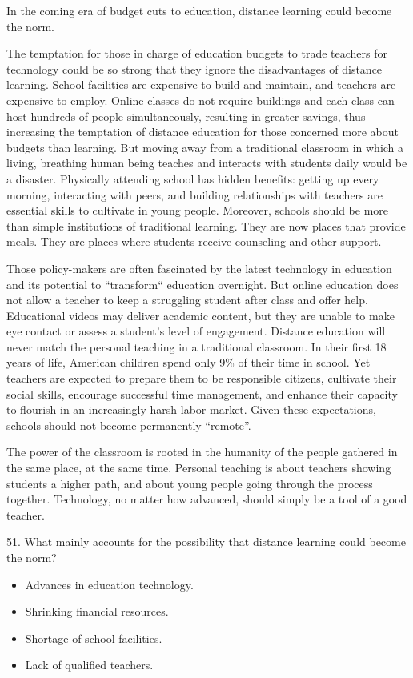 \documentclass[UTF8,11pt]{ctexart}
\begin{document}
In the coming era of budget cuts to education, distance learning could become the norm.


The temptation for those in charge of education budgets to trade teachers for technology could be so strong that they ignore the disadvantages of distance learning. School facilities are expensive to build and maintain, and teachers are expensive to employ. Online classes do not require buildings and each class can host hundreds of people simultaneously, resulting in greater savings, thus increasing the temptation of distance education for those concerned more about budgets than learning. But moving away from a traditional classroom in which a living, breathing human being teaches and interacts with students daily would be a disaster. Physically attending school has hidden benefits: getting up every morning, interacting with peers, and building relationships with teachers are essential skills to cultivate in young people. Moreover, schools should be more than simple institutions of traditional learning. They are now places that provide meals. They are places where students receive counseling and other support.


Those policy-makers are often fascinated by the latest technology in education and its potential to “transform“ education overnight. But online education does not allow a teacher to keep a struggling student after class and offer help. Educational videos may deliver academic content, but they are unable to make eye contact or assess a student's level of engagement. Distance education will never match the personal teaching in a traditional classroom. In their first 18 years of life, American children spend only 9\% of their time in school. Yet teachers are expected to prepare them to be responsible citizens, cultivate their social skills, encourage successful time management, and enhance their capacity to flourish in an increasingly harsh labor market. Given these expectations, schools should not become permanently “remote”.


The power of the classroom is rooted in the humanity of the people gathered in the same place, at the same time. Personal teaching is about teachers showing students a higher path, and about young people going through the process together. Technology, no matter how advanced, should simply be a tool of a good teacher.


51. What mainly accounts for the possibility that distance learning could become the norm?


\begin{itemize}[leftmargin=2em,itemsep=.2em,topsep=.4em]\item[A.] Advances in education technology.
\item[B.] Shrinking financial resources.
\item[C.] Shortage of school facilities.
\item[D.] Lack of qualified teachers.
\end{itemize}
\end{document}
